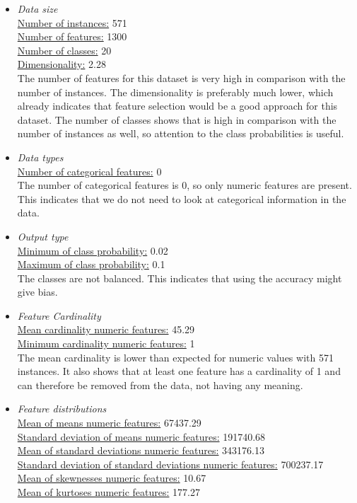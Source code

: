 \documentclass[10pt,a4paper]{article}
\begin{document}
	\begin{itemize}
		\item \textit{Data size} \\
		\underline{Number of instances:} 571 \\
		\underline{Number of features:} 1300 \\
		\underline{Number of classes:} 20 \\
		\underline{Dimensionality:} 2.28 \\
		
		The number of features for this dataset is very high in comparison with the number of instances. The dimensionality is preferably much lower, which already indicates that feature selection would be a good approach for this dataset. The number of classes shows that is high in comparison with the number of instances as well, so attention to the class probabilities is useful.
		
		\item \textit{Data types} \\
		\underline{Number of categorical features:} 0 \\
		
		The number of categorical features is 0, so only numeric features are present. This indicates that we do not need to look at categorical information in the data.
		
		\item \textit{Output type} \\
		\underline{Minimum of class probability:} 0.02 \\
		\underline{Maximum of class probability:} 0.1 \\
		
		The classes are not balanced. This indicates that using the accuracy might give bias.
		
		\item \textit{Feature Cardinality} \\
		\underline{Mean cardinality numeric features:} 45.29 \\
		\underline{Minimum cardinality numeric features:} 1 \\
		
		The mean cardinality is lower than expected for numeric values with 571 instances. It also shows that at least one feature has a cardinality of 1 and can therefore be removed from the data, not having any meaning.
		
		\item \textit{Feature distributions} \\
		\underline{Mean of means numeric features:} 67437.29 \\
		\underline{Standard deviation of means numeric features:} 191740.68 \\
		\underline{Mean of standard deviations numeric features:} 343176.13 \\
		\underline{Standard deviation of standard deviations numeric features:} 700237.17 \\
		\underline{Mean of skewnesses numeric features:} 10.67 \\
		\underline{Mean of kurtoses numeric features:} 177.27 \\
		

\end{itemize}
\end{document}
